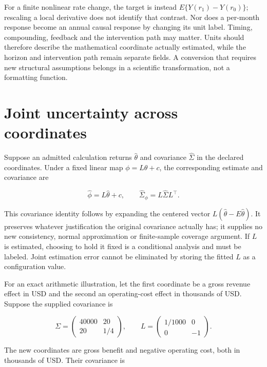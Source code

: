 For a finite nonlinear rate change, the target is instead
\(E\{Y(r_1)-Y(r_0)\}\); rescaling a local derivative does not identify
that contrast. Nor does a per-month response become an annual causal
response by changing its unit label. Timing, compounding, feedback and
the intervention path may matter. Units should therefore describe the
mathematical coordinate actually estimated, while the horizon and
intervention path remain separate fields. A conversion that requires new
structural assumptions belongs in a scientific transformation, not a
formatting function.

\hypertarget{joint-uncertainty-across-coordinates}{%
\section{Joint uncertainty across
coordinates}\label{joint-uncertainty-across-coordinates}}

Suppose an admitted calculation returns \(\widehat\theta\) and
covariance \(\widehat\Sigma\) in the declared coordinates. Under a fixed
linear map \(\phi=L\theta+c\), the corresponding estimate and covariance
are

\[
 \widehat\phi=L\widehat\theta+c,
 \qquad \widehat\Sigma_\phi=L\widehat\Sigma L^\top.
\]

This covariance identity follows by expanding the centered vector
\(L(\widehat\theta-E\widehat\theta)\). It preserves whatever
justification the original covariance actually has; it supplies no new
consistency, normal approximation or finite-sample coverage argument. If
\(L\) is estimated, choosing to hold it fixed is a conditional analysis
and must be labeled. Joint estimation error cannot be eliminated by
storing the fitted \(L\) as a configuration value.

For an exact arithmetic illustration, let the first coordinate be a
gross revenue effect in USD and the second an operating-cost effect in
thousands of USD. Suppose the supplied covariance is

\[
 \Sigma=\begin{pmatrix}40000&20\\20&1/4\end{pmatrix},
 \qquad L=\begin{pmatrix}1/1000&0\\0&-1\end{pmatrix}.
\]

The new coordinates are gross benefit and negative operating cost, both
in thousands of USD. Their covariance is

